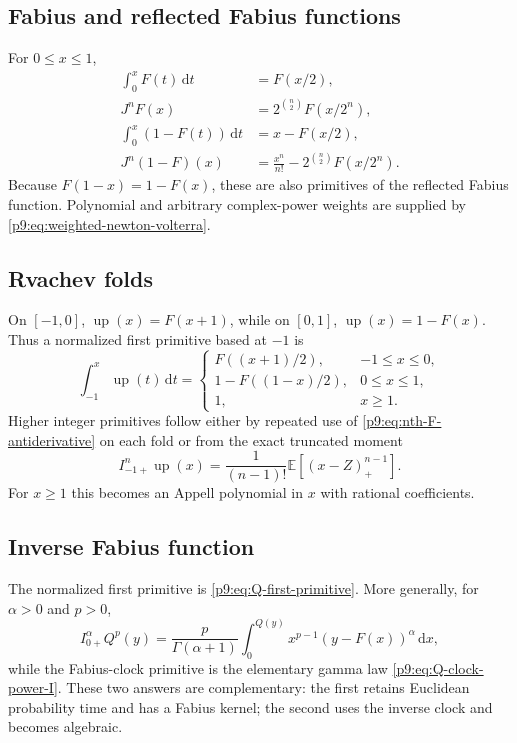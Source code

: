 \documentclass[11pt,oneside]{article}
\theoremstyle{definition}
\theoremstyle{remark}
\newcommand{\Up}{\operatorname{up}}
\newcommand{\E}{\mathbb E}
\newcommand{\dd}{\,\mathrm d}
\newcommand{\1}{\mathbf 1}
\begin{document}
\subsection{Fabius and reflected Fabius functions}

For $0\le x\le1$,
\begin{align}
 \int_0^xF(t)\dd t
 &=F(x/2),
 \label{p9:eq:first-F-antiderivative}\\
 J^nF(x)
 &=2^{\binom n2}F(x/2^n),
 \label{p9:eq:nth-F-antiderivative}\\
 \int_0^x(1-F(t))\dd t
 &=x-F(x/2),
 \label{p9:eq:first-survival-antiderivative}\\
 J^n(1-F)(x)
 &=\frac{x^n}{n!}-2^{\binom n2}F(x/2^n).
 \label{p9:eq:nth-survival-antiderivative}
\end{align}
Because $F(1-x)=1-F(x)$, these are also primitives of the reflected Fabius
function.  Polynomial and arbitrary complex-power weights are supplied by
\cref{p9:eq:weighted-newton-volterra}.

\subsection{Rvachev folds}

On $[-1,0]$, $\Up(x)=F(x+1)$, while on $[0,1]$,
$\Up(x)=1-F(x)$.  Thus a normalized first primitive based at $-1$ is
\begin{equation}
 \int_{-1}^x\Up(t)\dd t
 =\begin{cases}
 F((x+1)/2),&-1\le x\le0,\\[1mm]
 1-F((1-x)/2),&0\le x\le1,\\[1mm]
 1,&x\ge1.
 \end{cases}
 \label{p9:eq:up-first-piecewise}
\end{equation}
Higher integer primitives follow either by repeated use of
\cref{p9:eq:nth-F-antiderivative} on each fold or from the exact truncated moment
\begin{equation}
 I_{-1+}^n\Up(x)
 =\frac1{(n-1)!}\E[(x-Z)_+^{n-1}].
 \label{p9:eq:up-n-incomplete-moment}
\end{equation}
For $x\ge1$ this becomes an Appell polynomial in $x$ with rational
coefficients.

\subsection{Inverse Fabius function}

The normalized first primitive is \cref{p9:eq:Q-first-primitive}.  More generally,
for $\alpha>0$ and $p>0$,
\begin{equation}
 I_{0+}^\alpha Q^p(y)
 =\frac{p}{\Gamma(\alpha+1)}
   \int_0^{Q(y)}x^{p-1}(y-F(x))^\alpha\dd x,
 \label{p9:eq:inverse-fractional-antiderivative-catalog}
\end{equation}
while the Fabius-clock primitive is the elementary gamma law
\cref{p9:eq:Q-clock-power-I}.  These two answers are complementary: the first
retains Euclidean probability time and has a Fabius kernel; the second uses
the inverse clock and becomes algebraic.
\end{document}
